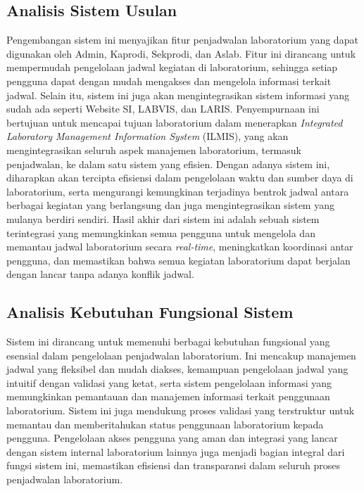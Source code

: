 \subsection{Analisis Sistem Usulan}
Pengembangan sistem ini menyajikan fitur penjadwalan laboratorium yang dapat digunakan oleh Admin, Kaprodi, Sekprodi, dan Aslab. Fitur ini dirancang untuk mempermudah pengelolaan jadwal kegiatan di laboratorium, sehingga setiap pengguna dapat dengan mudah mengakses dan mengelola informasi terkait jadwal. Selain itu, sistem ini juga akan mengintegrasikan sistem informasi yang sudah ada seperti Website SI, LABVIS, dan LARIS. Penyempurnaan ini bertujuan untuk mencapai tujuan laboratorium dalam menerapkan \textit{Integrated Laboratory Management Information System} (ILMIS), yang akan mengintegrasikan seluruh aspek manajemen laboratorium, termasuk penjadwalan, ke dalam satu sistem yang efisien. Dengan adanya sistem ini, diharapkan akan tercipta efisiensi dalam pengelolaan waktu dan sumber daya di laboratorium, serta mengurangi kemungkinan terjadinya bentrok jadwal antara berbagai kegiatan yang berlangsung dan juga mengintegrasikan sistem yang mulanya berdiri sendiri. Hasil akhir dari sistem ini adalah sebuah sistem terintegrasi yang memungkinkan semua pengguna untuk mengelola dan memantau jadwal laboratorium secara \textit{real-time}, meningkatkan koordinasi antar pengguna, dan memastikan bahwa semua kegiatan laboratorium dapat berjalan dengan lancar tanpa adanya konflik jadwal.

\subsection{Analisis Kebutuhan Fungsional Sistem}
Sistem ini dirancang untuk memenuhi berbagai kebutuhan fungsional yang esensial dalam pengelolaan penjadwalan laboratorium. Ini mencakup manajemen jadwal yang fleksibel dan mudah diakses, kemampuan pengelolaan jadwal yang intuitif dengan validasi yang ketat, serta sistem pengelolaan informasi yang memungkinkan pemantauan dan manajemen informasi terkait penggunaan laboratorium. Sistem ini juga mendukung proses validasi yang terstruktur  untuk memantau dan memberitahukan status penggunaan laboratorium kepada pengguna. Pengelolaan akses pengguna yang aman dan integrasi yang lancar dengan sistem internal laboratorium lainnya juga menjadi bagian integral dari fungsi sistem ini, memastikan efisiensi dan transparansi dalam seluruh proses penjadwalan laboratorium.


